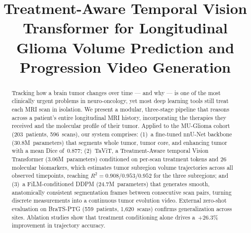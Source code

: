 \documentclass[conference]{IEEEtran}
\begin{document}
%
\title{Treatment-Aware Temporal Vision Transformer for Longitudinal Glioma Volume Prediction and Progression Video Generation}


\author{
}


\maketitle

\begin{abstract}
Tracking how a brain tumor changes over time --- and why --- is one of the most
clinically urgent problems in neuro-oncology, yet most deep learning tools still
treat each MRI scan in isolation. We present a modular, three-stage pipeline
that reasons across a patient's entire longitudinal MRI history, incorporating
the therapies they received and the molecular profile of their tumor. Applied to
the MU-Glioma cohort (203~patients, 596~scans), our system comprises:
(1)~a fine-tuned nnU-Net backbone (30.8M~parameters) that segments whole tumor,
tumor core, and enhancing tumor with a mean Dice of~0.877;
(2)~TaViT, a Treatment-Aware temporal Vision Transformer (3.06M~parameters)
conditioned on per-scan treatment tokens and 26 molecular biomarkers, which
estimates tumor subregion volume trajectories across all observed timepoints,
reaching $R^2 = 0.908/0.953/0.952$ for the three subregions; and
(3)~a FiLM-conditioned DDPM (24.7M~parameters) that generates smooth,
anatomically consistent segmentation frames between consecutive scan pairs,
turning discrete measurements into a continuous tumor evolution video.
External zero-shot evaluation on BraTS-PTG (559~patients, 1,620~scans) confirms
generalization across sites. Ablation studies show that treatment conditioning
alone drives a~$+26.3\%$ improvement in trajectory accuracy.
\end{abstract}
\end{document}
